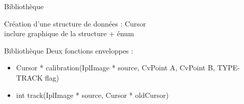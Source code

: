 \documentclass{beamer}
\begin{document}
            \begin{frame}{Bibliothèque}

            Création d'une structure de données : Cursor\\
	inclure graphique de la structure + énum
            \end{frame}
            
            \begin{frame}{Bibliothèque}
            Deux fonctions enveloppes : \\
                  \begin{itemize}
                        \item{Cursor * calibration(IplImage * source, CvPoint A, CvPoint B, TYPE-TRACK flag)}
                        \item{int track(IplImage * source, Cursor * oldCursor)}
                  \end{itemize}            
            \end{frame}
\end{document}
